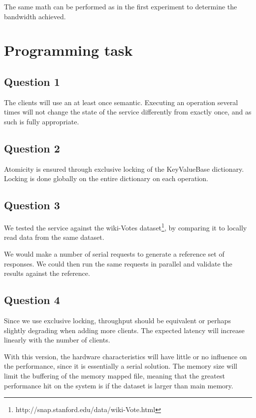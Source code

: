 \documentclass[11pt,a4paper]{article}
\begin{document}
The same math can be performed as in the first experiment to determine the
bandwidth achieved.

\section{Programming task}

\subsection{Question 1}
The clients will use an at least once semantic. Executing an operation
several times will not change the state of the service differently from
exactly once, and as such is fully appropriate.

\subsection{Question 2}
Atomicity is ensured through exclusive locking of the KeyValueBase dictionary.
Locking is done globally on the entire dictionary on each operation.

\subsection{Question 3}
We tested the service against the wiki-Votes dataset\footnote{http://snap.stanford.edu/data/wiki-Vote.html},
by comparing it to locally read data from the same dataset.

We would make a number of serial requests to generate a reference set of
responses. We could then run the same requests in parallel and validate the
results against the reference.

\subsection{Question 4}
Since we use exclusive locking, throughput should be equivalent or perhaps slightly degrading
when adding more clients. The expected latency will increase linearly with the number of
clients.

With this version, the hardware characteristics will have little or no influence on the
performance, since it is essentially a serial solution. The memory size will limit the
buffering of the memory mapped file, meaning that the greatest performance hit
on the system is if the dataset is larger than main memory.
\end{document}
